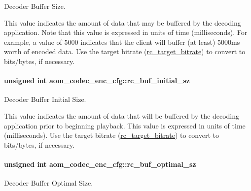 Decoder Buffer Size. 

This value indicates the amount of data that may be buffered by the decoding application. Note that this value is expressed in units of time (milliseconds). For example, a value of 5000 indicates that the client will buffer (at least) 5000ms worth of encoded data. Use the target bitrate (\hyperlink{structaom__codec__enc__cfg_ab21539da477dba7506d90353c27d218b}{rc\+\_\+target\+\_\+bitrate}) to convert to bits/bytes, if necessary. 
\paragraph[{\texorpdfstring{rc\+\_\+buf\+\_\+initial\+\_\+sz}{rc_buf_initial_sz}}]{\setlength{\rightskip}{0pt plus 5cm}unsigned int aom\+\_\+codec\+\_\+enc\+\_\+cfg\+::rc\+\_\+buf\+\_\+initial\+\_\+sz}\hypertarget{structaom__codec__enc__cfg_a6c25595e7dfcdf3229c3f66c91224fcc}{}\label{structaom__codec__enc__cfg_a6c25595e7dfcdf3229c3f66c91224fcc}


Decoder Buffer Initial Size. 

This value indicates the amount of data that will be buffered by the decoding application prior to beginning playback. This value is expressed in units of time (milliseconds). Use the target bitrate (\hyperlink{structaom__codec__enc__cfg_ab21539da477dba7506d90353c27d218b}{rc\+\_\+target\+\_\+bitrate}) to convert to bits/bytes, if necessary. 
\paragraph[{\texorpdfstring{rc\+\_\+buf\+\_\+optimal\+\_\+sz}{rc_buf_optimal_sz}}]{\setlength{\rightskip}{0pt plus 5cm}unsigned int aom\+\_\+codec\+\_\+enc\+\_\+cfg\+::rc\+\_\+buf\+\_\+optimal\+\_\+sz}\hypertarget{structaom__codec__enc__cfg_aa4d9838419e94e634a02d710da06c842}{}\label{structaom__codec__enc__cfg_aa4d9838419e94e634a02d710da06c842}


Decoder Buffer Optimal Size. 

